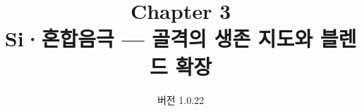 


\renewcommand{\theequation}{3.\arabic{equation}}
\renewcommand{\thesection}{3.\arabic{section}}

\title{\textbf{\LARGE Chapter 3}\\[0.35em]\Large Si·혼합음극 --- 골격의 생존 지도와 블렌드 확장}
\author{}
\date{\normalsize 버전 1.0.22}


\maketitle










